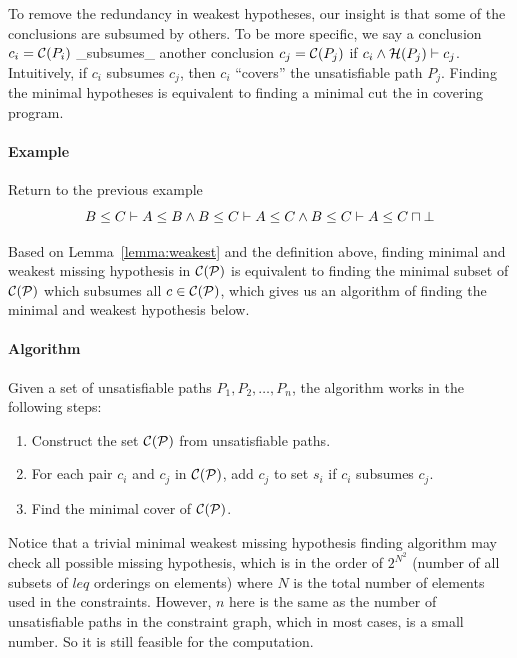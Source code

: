 To remove the redundancy in weakest hypotheses, our insight is that
some of the conclusions are subsumed by others. 
%
To be more specific, we say a conclusion $c_i=\mathcal{C}(P_i)$
_subsumes_ another conclusion $c_j=\mathcal{C}(P_j)$ if $c_i \land
\mathcal{H}(P_j) \vdash c_j$. Intuitively, if $c_i$ subsumes $c_j$, then
$c_i$ ``covers'' the unsatisfiable path $P_j$. Finding the minimal
hypotheses is equivalent to finding a minimal cut the in covering
program.

\paragraph{Example} Return to the previous example \[B\leq C \vdash
A\leq B \land B\leq C \vdash A\leq C \land B\leq C \vdash A\leq
C\sqcap \bot \]

Based on Lemma~\ref{lemma:weakest} and the definition above, finding
minimal and weakest missing hypothesis in $\mathcal{C}(\mathcal{P})$ is
equivalent to finding the minimal subset of $\mathcal{C}(\mathcal{P})$ which
subsumes all $c\in \mathcal{C}(\mathcal{P})$, which gives us an algorithm of
finding the minimal and weakest hypothesis below.

\paragraph{Algorithm}

Given a set of unsatisfiable paths $P_1, P_2, \dots, P_n$, the
algorithm works in the following steps:

\begin{enumerate}
\item Construct the set $\mathcal{C}(\mathcal{P})$ from unsatisfiable paths.

\item For each pair $c_i$ and $c_j$ in $\mathcal{C}(\mathcal{P})$, add $c_j$
to set $s_i$ if $c_i$ subsumes $c_j$.

\item Find the minimal cover of $\mathcal{C}(\mathcal{P})$.
\end{enumerate}

Notice that a trivial minimal weakest missing hypothesis finding
algorithm may check all possible missing hypothesis, which is in the
order of $2^{N^2}$ (number of all subsets of $leq$ orderings on
elements) where $N$ is the total number of elements used in the
constraints. However, $n$ here is the same as the number of
unsatisfiable paths in the constraint graph, which in most cases, is a
small number. So it is still feasible for the computation.

